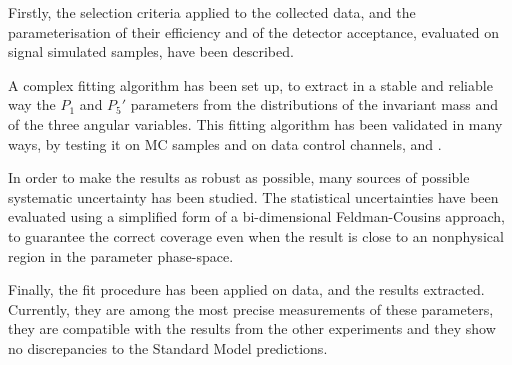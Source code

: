 Firstly, the selection criteria applied to the collected data, and the parameterisation of their efficiency and of the detector acceptance, evaluated on signal simulated samples, have been described.

A complex fitting algorithm has been set up, to extract in a stable and reliable way the $P_1$ and $P_5'$ parameters from the distributions of the \PKp\Pgpm\Pgmp\Pgmm invariant mass and of the three angular variables.
This fitting algorithm has been validated in many ways, by testing it on MC samples and on data control channels, \BtoKstJpsimumu and \BtoKstpsipmumu.

In order to make the results as robust as possible, many sources of possible systematic uncertainty has been studied.
The statistical uncertainties have been evaluated using a simplified form of a bi-dimensional Feldman-Cousins approach, to guarantee the correct coverage even when the result is close to an nonphysical region in the parameter phase-space.

Finally, the fit procedure has been applied on data, and the results extracted.
Currently, they are among the most precise measurements of these parameters, they are compatible with the results from the other experiments and they show no discrepancies to the Standard Model predictions.
